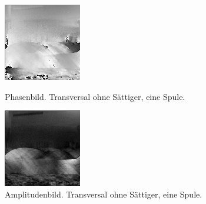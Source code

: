 \documentclass[
    11pt,
    ngerman
]{scrbook}
\begin{document}
\begin{figure}[htbp]
    \begin{minipage}[htbp]{.45\textwidth}
        \centering
        \includegraphics[width=.9\textwidth]{Abbildungen/2015-03-13_5_1.png}
        \caption{Phasenbild. Transversal ohne Sättiger, eine Spule.}
        \label{fig:2015-03-13_5_1}
    \end{minipage}
    \hfill
    \begin{minipage}[htbp]{.45\textwidth}
        \centering
        \includegraphics[width=.9\textwidth]{Abbildungen/2015-03-13_4_1.png}
    \caption{Amplitudenbild. Transversal ohne Sättiger, eine Spule.}
        \label{fig:2015-03-13_4_1}
    \end{minipage}
\end{figure}
\end{document}
